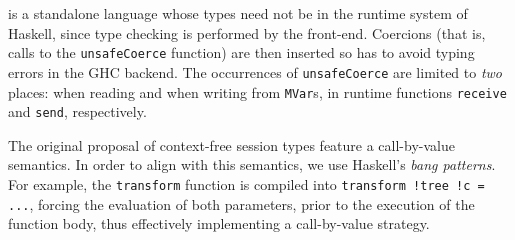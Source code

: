 
\freest{} is a standalone language whose types need not be in the
runtime system of Haskell, since type checking is performed by the
\freest{} front-end.
%
Coercions (that is, calls to the \lstinline|unsafeCoerce| function)
are then inserted so has to avoid typing errors in the GHC
backend. The occurrences of \lstinline|unsafeCoerce| are limited to
\emph{two} places: when reading and when writing from
\lstinline|MVar|s, in runtime functions \lstinline|receive| and
\lstinline|send|, respectively.

The original proposal of context-free session types feature a
call-by-value semantics. In order to align \freest{} with this
semantics, we use Haskell's \emph{bang patterns}. For example, the
\lstinline|transform| function is compiled into
\lstinline|transform !tree !c = ...|, forcing the evaluation of both
parameters, prior to the execution of the function body, thus
effectively implementing a call-by-value strategy.

